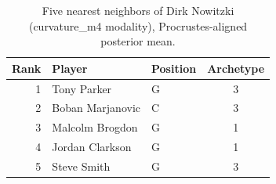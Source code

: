 \begin{table}[htbp]
  \centering\small
  \begin{tabular}{rllc}
    \toprule
    Rank & Player & Position & Archetype \\
    \midrule
    1 & Tony Parker & G & 3 \\
    2 & Boban Marjanovic & C & 3 \\
    3 & Malcolm Brogdon & G & 1 \\
    4 & Jordan Clarkson & G & 1 \\
    5 & Steve Smith & G & 3 \\
    \bottomrule
  \end{tabular}
  \caption{Five nearest neighbors of Dirk Nowitzki (curvature_m4 modality), Procrustes-aligned posterior mean.}
  \label{tab:Dirk_Nowitzki_neighbors_curvature_m4}
\end{table}

